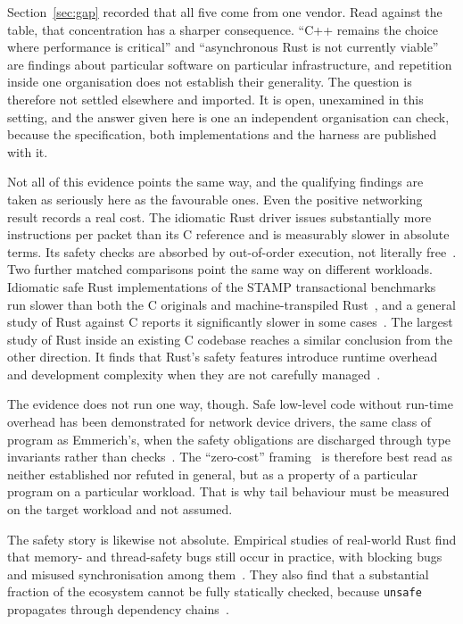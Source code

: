 \documentclass[english,oneside,a4paper,censored,csm,software-track-2020]{HYthesisML}
\begin{document}
Section~\ref{sec:gap} recorded that all five come from one vendor. Read against the table, that
concentration has a sharper consequence. ``C++ remains the choice where performance is critical''
and ``asynchronous Rust is not currently viable'' are findings about particular software on
particular infrastructure, and repetition inside one organisation does not establish their
generality. The question is therefore not settled elsewhere and imported. It is open, unexamined
in this setting, and the answer given here is one an independent organisation can check, because
the specification, both implementations and the harness are published with it.

Not all of this evidence points the same way, and the qualifying findings are taken as seriously
here as the favourable ones. Even the positive networking result records a real cost. The idiomatic Rust driver issues
substantially more instructions per packet than its C reference and is measurably slower in
absolute terms. Its safety checks are absorbed by out-of-order execution, not
literally free~\cite{emmerich2019drivers}. Two further matched comparisons point the same way on
different workloads. Idiomatic safe Rust implementations of the STAMP transactional benchmarks run
slower than both the C originals and machine-transpiled Rust~\cite{suchert2023stamp}, and a
general study of Rust against C reports it significantly slower in some
cases~\cite{okawa2024ruststudy}. The largest study of Rust inside an existing C codebase reaches a
similar conclusion from the other direction. It finds that Rust's safety features introduce
runtime overhead and development complexity when they are not carefully
managed~\cite{li2026rustlinux}.

The evidence does not run one way, though. Safe low-level code without run-time overhead has
been demonstrated for network device drivers, the same class of program as Emmerich's, when the
safety obligations are discharged through type invariants rather than checks~\cite{pirelli2023safelowlevel}.
The ``zero-cost'' framing~\cite{balasubramanian2017rust} is therefore best read as neither
established nor refuted in general, but as a property of a particular program on a particular
workload. That is why tail behaviour must be measured on the target workload and not assumed.

The safety story is likewise not absolute. Empirical studies of real-world Rust find that memory-
and thread-safety bugs still occur in practice, with blocking bugs and misused synchronisation
among them~\cite{qin2020rust,qin2024safety}. They also find that a substantial fraction of the
ecosystem cannot be fully statically checked, because \texttt{unsafe} propagates through
dependency chains~\cite{evans2020rust}.
\end{document}
